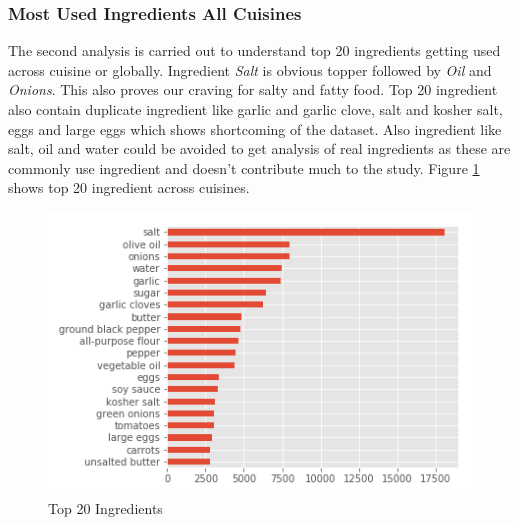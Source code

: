 \documentclass[sigconf]{acmart}
\begin{document}
\subsubsection{Most Used Ingredients All Cuisines}
The second analysis is carried out to understand top 20 ingredients getting used across cuisine or globally. Ingredient \emph{Salt} is obvious topper followed by \emph{Oil} and \emph{Onions}. This also proves our craving for salty and fatty food. Top 20 ingredient also contain duplicate ingredient like garlic and garlic clove, salt and kosher salt, eggs and large eggs which shows shortcoming of the dataset. Also ingredient like salt, oil and water could be avoided to get analysis of real ingredients as these are commonly use ingredient and doesn't contribute much to the study. Figure \ref{f:Ingredient_Distribution} shows top 20 ingredient across cuisines. 
\begin{figure}[!ht]
  \centering\includegraphics[width=\columnwidth]{images/Ingredient_Distribution.png}
  \caption{Top 20 Ingredients }\label{f:Ingredient_Distribution}
\end{figure}
\end{document}
